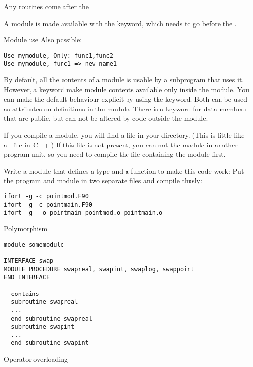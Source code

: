 Any routines come after the 

A module is made available with the  keyword, which
needs to go before the .
%
\begin{block}{Module use}
  \label{sl:moduleuse}
  Also possible:
\begin{verbatim}
Use mymodule, Only: func1,func2
Use mymodule, func1 => new_name1
\end{verbatim}
\end{block}

By default, all the contents of a module is usable by a subprogram
that uses it. However, a keyword  make module
contents available only inside the module.
You can make the default behaviour explicit by using the
 keyword. Both  can be used as
attributes on definitions in the module.
There is a keyword  for data members that
are public, but can not be altered by code outside the module.

If you compile a module, you will find a  file in your
directory. (This is little like a~ file in~C++.)
If this file is not present, you can not  the module in another
program unit, so you need to compile the file containing the module
first.

\begin{exercise}
  \label{ex:fpointmod}
  Write a module  that defines a type  and a
  function  to make this code work:
  Put the program and module in two separate files and compile thusly:
\begin{verbatim}
ifort -g -c pointmod.F90
ifort -g -c pointmain.F90
ifort -g  -o pointmain pointmod.o pointmain.o 
\end{verbatim}
\end{exercise}

 {Polymorphism}

\begin{verbatim}
module somemodule

INTERFACE swap
MODULE PROCEDURE swapreal, swapint, swaplog, swappoint
END INTERFACE

  contains
  subroutine swapreal
  ...
  end subroutine swapreal
  subroutine swapint
  ...
  end subroutine swapint
\end{verbatim}

 {Operator overloading}

